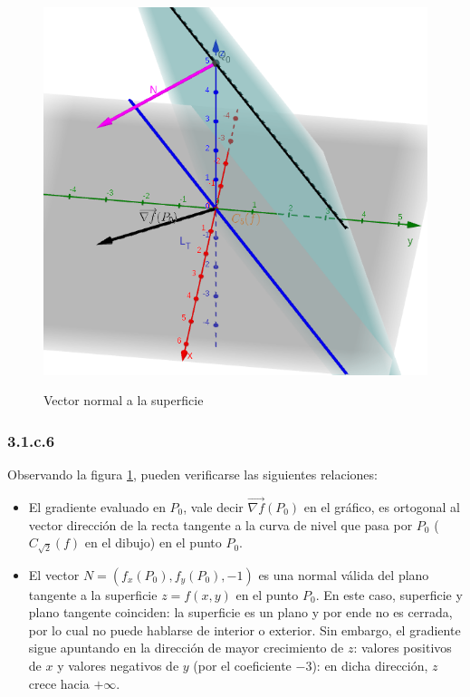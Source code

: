 \documentclass{article}
\begin{document}
\begin{figure}[ht]
\caption{Vector normal a la superficie}
\includegraphics[scale=0.35]{img/ejercicios/3/1-c-5.png} 
\centering
\label{fig:1-c-5}
\end{figure}

\subsubsection*{3.1.c.6}
\label{subsubsec:3.1.c.6}

Observando la figura \ref{fig:1-c-5}, pueden verificarse las siguientes relaciones:

\begin{itemize}
\item El gradiente evaluado en $P_0$, vale decir $\overrightarrow{ \nabla f}(P_0)$ en el gráfico, es ortogonal al vector dirección de la recta tangente a la curva de nivel que pasa por $P_0$ ($C_{\sqrt{2}}(f)$ en el dibujo) en el punto $P_0$.
\item El vector $N = (f_x(P_0), f_y(P_0), -1)$ es una normal válida del plano tangente a la superficie $z = f(x,y)$ en el punto $P_0$. En este caso, superficie y plano tangente coinciden: la superficie es un plano y por ende no es cerrada, por lo cual no puede hablarse de interior o exterior. Sin embargo, el gradiente sigue apuntando en la dirección de mayor crecimiento de $z$: valores positivos de $x$ y valores negativos de $y$ (por el coeficiente $-3$): en dicha dirección, $z$ crece hacia $+\infty$.
\end{itemize}
\end{document}
